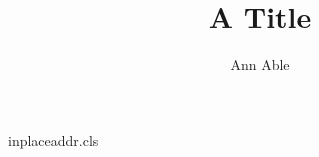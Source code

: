\begin{filecontents*}[overwrite]{inplaceaddr.cls}
\let\@author\@empty\renewcommand\author[2][]{\g@addto@macro\@author{#2 }}
\newcommand\address[2][]{\par{\small\ifx\relax#1\relax\else(#1) \fi #2}\par}
\def\inst#1{\textsuperscript{#1}}
\end{filecontents*}
\documentclass{inplaceaddr}

\title{A Title}
\author{Ann Able}
\address[\inst{1}]{Univ A, Town}
\address[\inst{9}]{Univ Z, Zed}
Body.

